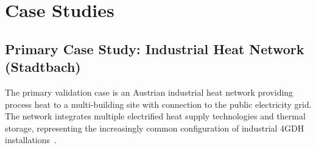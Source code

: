 \documentclass[review,3p]{elsarticle}
\begin{document}
\section{Case Studies}
\label{sec:case_studies}

\subsection{Primary Case Study: Industrial Heat Network (Stadtbach)}
\label{sec:case_stadtbach}

The primary validation case is an Austrian industrial heat network
providing process heat to a multi-building site with connection to
the public electricity grid. The network integrates multiple
electrified heat supply technologies and thermal storage, representing
the increasingly common configuration of industrial 4GDH
installations~\cite{Lund2014_4GDH}.
\end{document}
